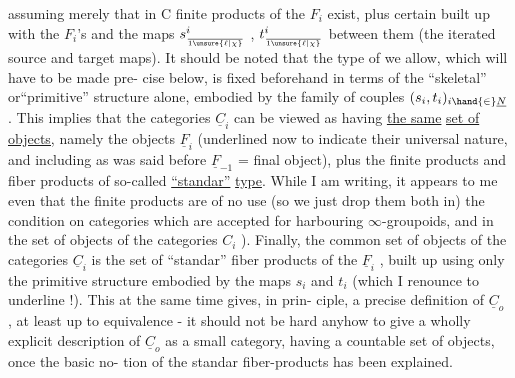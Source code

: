
assuming merely that in C  finite products of the $F_i$ exist,
plus certain  built up with the $F_i$'s and the maps $s^{i}_{\over{1}{\unsure{\ell|\chi}}}$ , $t^{i}_{\over{1}{\unsure{\ell|\chi}}}$
between them (the iterated source and target maps). It should be noted
that the type of \inserted{$\varprojlim$} we allow, which will have to be made pre-%
cise below, is fixed beforehand in terms of the ``skeletal'' or``primitive''
structure alone, embodied by the family of couples $(s_i,t_i)_{i\hand{\in}\underline{N}}$ . This
implies that the  categories $\underline{C}_i$ can be viewed as having \uline{the same}
\uline{set of objects,} namely the objects $\underline{F}_i$ (underlined now to indicate their
universal nature, and including as was said before $\underline{F}_{-1}$ = final object),
plus the finite products and  fiber products of  so-called
\uline{``standar''} \uline{type}. While I am writing, it appears to me  even that the
finite products  are of no use (so we just drop them both in) the condition
on categories which are accepted for harbouring $\infty$-groupoids, and in the
set of objects of the categories $C_i$ ). Finally, the common set of objects
of the categories $\underline{C}_i$ is the set of ``standar''  fiber products of the $\underline{F}_i$ ,
built up using only the primitive structure embodied by the maps $s_i$ and $t_i$
(which I renounce  to underline !). This at the same time gives, in prin-%
ciple, a precise definition of $\underline{C}_o$ , at least up to equivalence - it
should not be hard anyhow to give a wholly explicit description of $\underline{C}_o$ as
a small category, having a countable set of objects, once the basic no-%
tion of the standar  fiber-products has been explained.

